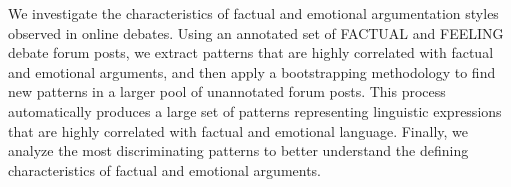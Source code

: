 We investigate the characteristics of factual and emotional argumentation styles observed in online debates. Using an annotated set of FACTUAL and FEELING debate forum posts, we extract patterns that are highly correlated with factual and emotional arguments, and then apply a bootstrapping methodology to find new patterns in a larger pool of unannotated forum posts. This process automatically produces a large set of patterns representing linguistic expressions that are highly correlated with factual and emotional language. Finally, we analyze the most discriminating patterns to better understand the defining characteristics of factual and emotional arguments.

